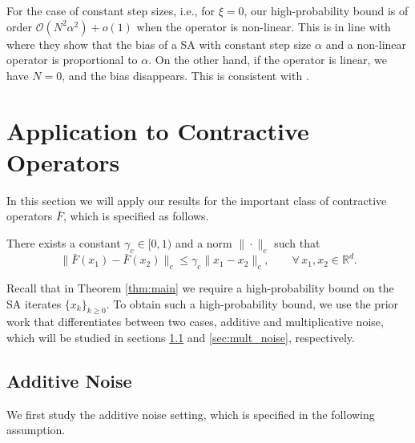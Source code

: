 \documentclass[letterpaper, 10 pt]{article}
\begin{document}
\begin{remark}
    For the case of constant step sizes, i.e., for $\xi=0$, our high-probability bound is of order $\mathcal{O}(N^2\alpha^2)+o(1)$ when the operator is non-linear. This is in line with  \cite{lauand2022bias} where they show that the bias of a SA with constant step size $\alpha$ and a non-linear operator is proportional to $\alpha$. On the other hand, if the operator is linear, we have $N=0$, and the bias disappears. This is consistent with  \cite{mou2020linear}.
\end{remark}


\section{Application to Contractive Operators}\label{sec:application}

In this section we will apply our results for the important class of contractive operators $\bar{F}$, which is specified as follows.

\begin{assumption}\label{ass:contraction}
There exists a constant $\gamma_c\in[0,1)$ and a norm $\|\cdot\|_c$ such that
\[ \|\bar{F}(x_1)-\bar{F}(x_2)\|_c\leq \gamma_c\|x_1-x_2\|_c, \qquad \forall \, x_1,x_2\in\mathbb{R}^d. \]
\end{assumption}


Recall that in Theorem \ref{thm:main} we require a high-probability bound on the SA iterates $\{x_k\}_{k\geq0}$. To obtain such a high-probability bound, we use the prior work \cite{chen2023concentration} that differentiates between two cases, additive and multiplicative noise, which will be studied in sections \ref{sec:additive_noise} and \ref{sec:mult_noise}, respectively.


\subsection{Additive Noise}\label{sec:additive_noise}

We first study the additive noise setting, which is specified in the following assumption.
\end{document}

